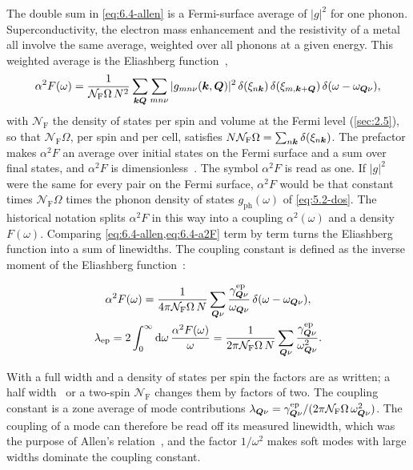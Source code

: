 The double sum in \cref{eq:6.4-allen} is a Fermi-surface average of $|g|^2$ for one phonon. Superconductivity, the electron mass enhancement and the resistivity of a metal all involve the same average, weighted over all phonons at a given energy. This weighted average is the Eliashberg function~\cite{eliashberg1960interactions},
\begin{equation}
  \alpha^2F(\omega) = \frac{1}{\mathcal{N}_{\mathrm{F}}\Omega\,N^2}\sum_{\bm{k}\bm{Q}}\sum_{mn\nu}|g_{mn\nu}(\bm{k},\bm{Q})|^2\,\delta(\xi_{n\bm{k}})\,\delta(\xi_{m,\bm{k}+\bm{Q}})\,\delta(\omega - \omega_{\bm{Q}\nu}) ,
  \label{eq:6.4-a2F}
\end{equation}
with $\mathcal{N}_{\mathrm{F}}$ the density of states per spin and volume at the Fermi level (\cref{sec:2.5}), so that $\mathcal{N}_{\mathrm{F}}\Omega$, per spin and per cell, satisfies $N\mathcal{N}_{\mathrm{F}}\Omega = \sum_{n\bm{k}}\delta(\xi_{n\bm{k}})$. The prefactor makes $\alpha^2F$ an average over initial states on the Fermi surface and a sum over final states, and $\alpha^2F$ is dimensionless~\cite[Eq.~(205)]{giustino2017electron}. The symbol $\alpha^2F$ is read as one. If $|g|^2$ were the same for every pair on the Fermi surface, $\alpha^2F$ would be that constant times $\mathcal{N}_{\mathrm{F}}\Omega$ times the phonon density of states $g_{\mathrm{ph}}(\omega)$ of \cref{eq:5.2-dos}. The historical notation splits $\alpha^2F$ in this way into a coupling $\alpha^2(\omega)$ and a density $F(\omega)$. Comparing \cref{eq:6.4-allen,eq:6.4-a2F} term by term turns the Eliashberg function into a sum of linewidths. The coupling constant is defined as the inverse moment of the Eliashberg function~\cite[Eq.~(206)]{giustino2017electron}:
\begin{keyresult}
\begin{equation}
  \begin{gathered}
  \alpha^2F(\omega) = \frac{1}{4\pi\mathcal{N}_{\mathrm{F}}\Omega\,N}\sum_{\bm{Q}\nu}\frac{\gamma^{\mathrm{ep}}_{\bm{Q}\nu}}{\omega_{\bm{Q}\nu}}\,\delta(\omega - \omega_{\bm{Q}\nu}), \\
  \lambda_{\mathrm{ep}} = 2\int_0^\infty\mathrm{d}\omega\,\frac{\alpha^2F(\omega)}{\omega} = \frac{1}{2\pi\mathcal{N}_{\mathrm{F}}\Omega\,N}\sum_{\bm{Q}\nu}\frac{\gamma^{\mathrm{ep}}_{\bm{Q}\nu}}{\omega_{\bm{Q}\nu}^2} .
  \end{gathered}
  \label{eq:6.4-lambda}
\end{equation}
\end{keyresult}
With a full width and a density of states per spin the factors are as written; a half width~\cite[Eq.~(185)]{giustino2017electron} or a two-spin $\mathcal{N}_{\mathrm{F}}$ changes them by factors of two. The coupling constant is a zone average of mode contributions $\lambda_{\bm{Q}\nu} = \gamma^{\mathrm{ep}}_{\bm{Q}\nu}/(2\pi\mathcal{N}_{\mathrm{F}}\Omega\,\omega_{\bm{Q}\nu}^2)$. The coupling of a mode can therefore be read off its measured linewidth, which was the purpose of Allen's relation~\cite{allen1972neutron}, and the factor $1/\omega^2$ makes soft modes with large widths dominate the coupling constant.

